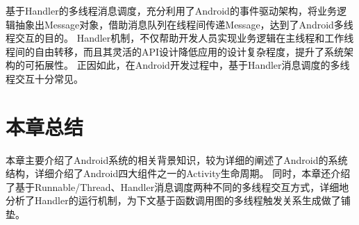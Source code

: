基于Handler的多线程消息调度，充分利用了Android的事件驱动架构，将业务逻辑抽象出Message对象，借助消息队列在线程间传递Message，达到了Android多线程交互的目的。
Handler机制，不仅帮助开发人员实现业务逻辑在主线程和工作线程间的自由转移，而且其灵活的API设计降低应用的设计复杂程度，提升了系统架构的可拓展性。
正因如此，在Android开发过程中，基于Handler消息调度的多线程交互十分常见。


\section{本章总结}

本章主要介绍了Android系统的相关背景知识，较为详细的阐述了Android的系统结构，详细介绍了Android四大组件之一的Activity生命周期。
同时，本章还介绍了基于Runnable/Thread、Handler消息调度两种不同的多线程交互方式，详细地分析了Handler的运行机制，为下文基于函数调用图的多线程触发关系生成做了铺垫。
